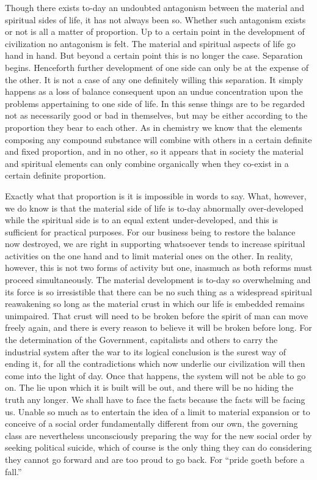 \documentclass{book}
\begin{document}
Though there exists to-day an undoubted antagonism between the material and spiritual sides of life, it has not always been so. Whether such antagonism exists or not is all a matter of proportion. Up to a certain point in the development of civilization no antagonism is felt. The material and spiritual aspects of life go hand in hand. But beyond a certain point this is no longer the case. Separation begins. Henceforth further development of one side can only be at the expense of the other. It is not a case of any one definitely willing this separation. It simply happens as a loss of balance consequent upon an undue concentration upon the problems appertaining to one side of life. In this sense things are to be regarded not as necessarily good or bad in themselves, but may be either according to the proportion they bear to each other. As in chemistry we know that the elements composing any compound substance will combine with others in a certain definite and fixed proportion, and in no other, so it appears that in society the material and spiritual elements can only combine organically when they co-exist in a certain definite proportion.

Exactly what that proportion is it is impossible in words to say. What, however, we do know is that the material side of life is to-day abnormally over-developed while the spiritual side is to an equal extent under-developed, and this is sufficient for practical purposes. For our business being to restore the balance now destroyed, we are right in supporting whatsoever tends to increase spiritual activities on the one hand and to limit material ones on the other. In reality, however, this is not two forms of activity but one, inasmuch as both reforms must proceed simultaneously. The material development is to-day so overwhelming and its force is so irresistible that there can be no such thing as a widespread spiritual reawakening so long as the material crust in which our life is embedded remains unimpaired. That crust will need to be broken before the spirit of man can move freely again, and there is every reason to believe it will be broken before long. For the determination of the Government, capitalists and others to carry the industrial system after the war to its logical conclusion is the surest way of ending it, for all the contradictions which now underlie our civilization will then come into the light of day. Once that happens, the system will not be able to go on. The lie upon which it is built will be out, and there will be no hiding the truth any longer. We shall have to face the facts because the facts will be facing us. Unable so much as to entertain the idea of a limit to material expansion or to conceive of a social order fundamentally different from our own, the governing class are nevertheless unconsciously preparing the way for the new social order by seeking political suicide, which of course is the only thing they can do considering they cannot go forward and are too proud to go back. For “pride goeth before a fall.”
\end{document}
